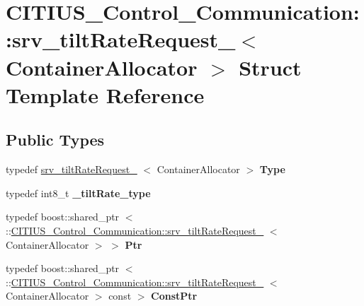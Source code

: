 \hypertarget{struct_c_i_t_i_u_s___control___communication_1_1srv__tilt_rate_request__}{\section{\-C\-I\-T\-I\-U\-S\-\_\-\-Control\-\_\-\-Communication\-:\-:srv\-\_\-tilt\-Rate\-Request\-\_\-$<$ \-Container\-Allocator $>$ \-Struct \-Template \-Reference}
\label{struct_c_i_t_i_u_s___control___communication_1_1srv__tilt_rate_request__}
}
\subsection*{\-Public \-Types}
\begin{DoxyCompactItemize}
\item 
\hypertarget{struct_c_i_t_i_u_s___control___communication_1_1srv__tilt_rate_request___ac50ef11870de5693a0e0229d7e39c5be}{typedef \hyperlink{struct_c_i_t_i_u_s___control___communication_1_1srv__tilt_rate_request__}{srv\-\_\-tilt\-Rate\-Request\-\_\-}\*
$<$ \-Container\-Allocator $>$ {\bfseries \-Type}}\label{struct_c_i_t_i_u_s___control___communication_1_1srv__tilt_rate_request___ac50ef11870de5693a0e0229d7e39c5be}

\item 
\hypertarget{struct_c_i_t_i_u_s___control___communication_1_1srv__tilt_rate_request___a2a8945bf9e48d94f3a6e97f61cbe87bb}{typedef int8\-\_\-t {\bfseries \-\_\-tilt\-Rate\-\_\-type}}\label{struct_c_i_t_i_u_s___control___communication_1_1srv__tilt_rate_request___a2a8945bf9e48d94f3a6e97f61cbe87bb}

\item 
\hypertarget{struct_c_i_t_i_u_s___control___communication_1_1srv__tilt_rate_request___a05a9dc36a47456a5cd55d3c3b1e24639}{typedef boost\-::shared\-\_\-ptr\*
$<$ \-::\hyperlink{struct_c_i_t_i_u_s___control___communication_1_1srv__tilt_rate_request__}{\-C\-I\-T\-I\-U\-S\-\_\-\-Control\-\_\-\-Communication\-::srv\-\_\-tilt\-Rate\-Request\-\_\-}\*
$<$ \-Container\-Allocator $>$ $>$ {\bfseries \-Ptr}}\label{struct_c_i_t_i_u_s___control___communication_1_1srv__tilt_rate_request___a05a9dc36a47456a5cd55d3c3b1e24639}

\item 
\hypertarget{struct_c_i_t_i_u_s___control___communication_1_1srv__tilt_rate_request___aab70d33272465d579af0dfb97df05063}{typedef boost\-::shared\-\_\-ptr\*
$<$ \-::\hyperlink{struct_c_i_t_i_u_s___control___communication_1_1srv__tilt_rate_request__}{\-C\-I\-T\-I\-U\-S\-\_\-\-Control\-\_\-\-Communication\-::srv\-\_\-tilt\-Rate\-Request\-\_\-}\*
$<$ \-Container\-Allocator $>$ const  $>$ {\bfseries \-Const\-Ptr}}\label{struct_c_i_t_i_u_s___control___communication_1_1srv__tilt_rate_request___aab70d33272465d579af0dfb97df05063}

\end{DoxyCompactItemize}
